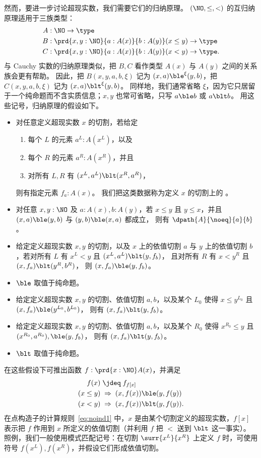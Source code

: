 然而，要进一步讨论超现实数，我们需要它们的归纳原理。
$(\NO,\le,<)$ 的互归纳原理适用于三族类型：
\begin{align*}
  A &: \NO\to\type\\
  B &: \prd{x,y:\NO}{a:A(x)}{b:A(y)} (x\le y) \to \type\\
  C &: \prd{x,y:\NO}{a:A(x)}{b:A(y)} (x<y) \to \type.
\end{align*}
与 Cauchy 实数的归纳原理类似，把 $B,C$ 看作类型 $A(x)$ 与 $A(y)$ 之间的关系族会更有帮助。
因此，把 $B(x,y,a,b,\xi)$ 记为 $(x,a) \ble^\xi (y,b)$，把 $C(x,y,a,b,\xi)$ 记为 $(x,a) \blt^\xi (y,b)$。
同样地，我们通常省略 $\xi$，因为它只居留于一个纯命题而不含实质信息；$x,y$ 也常可省略，只写 $a\ble b$ 或 $a\blt b$。
用这些记号，归纳原理的假设如下。
\begin{itemize}
\item 对任意定义超现实数 $x$ 的切割，若给定
  \begin{enumerate}
  \item 每个 $L$ 的元素 $a^L:A(x^L)$，以及
  \item 每个 $R$ 的元素 $a^R:A(x^R)$，并且
  \item 对所有 $L,R$ 有 $(x^L,a^L) \blt (x^R,a^R)$，
  \end{enumerate}
  则有指定元素 $f_a:A(x)$。
  我们把这类数据称为定义 $x$ 的切割上的
  。
\item 对任意 $x,y:\NO$ 及 $a:A(x), b:A(y)$，若 $x\le y$ 且 $y\le x$，并且 $(x,a) \ble (y,b)$
  与 $(y,b) \ble (x,a)$ 都成立，
  则有 $\dpath{A}{\noeq}{a}{b}$。
\item 给定定义超现实数 $x,y$ 的切割，以及 $x$ 上的依值切割 $a$ 与 $y$ 上的依值切割 $b$，若对所有 $L$ 有 $x^L<y$ 且 $(x^L,a^L)\blt (y,f_b)$，
  且对所有 $R$ 有 $x<y^R$ 且 $(x,f_a) \blt (y^R,b^R)$，
  则 $(x,f_a) \ble (y,f_b)$。
\item $\ble$ 取值于纯命题。
\item 给定定义超现实数 $x,y$ 的切割、依值切割 $a,b$，以及某个 $L_0$ 使得 $x\le y^{L_0}$ 且 $(x,f_a) \ble (y^{L_0},b^{L_0})$，
  则有 $(x,f_a) \blt (y,f_b)$。
\item 给定定义超现实数 $x,y$ 的切割、依值切割 $a,b$，以及某个 ${R_0}$ 使得 $x^{R_0}\le y$ 且 $(x^{R_0},a^{R_0}),\ble (y,f_b)$，
  则有 $(x,f_a) \blt (y,f_b)$。
\item $\blt$ 取值于纯命题。
\end{itemize}
在这些假设下可推出函数 $f:\prd{x:\NO} A(x)$，并满足
\begin{align}
  f(x) &\;\jdeq\; f_{f[x]} \label{eq:noind1}\\
  (x\le y) &\;\Rightarrow\; (x,f(x)) \ble (y,f(y)) \notag\\
  (x< y) &\;\Rightarrow\; (x,f(x)) \blt (y,f(y)). \notag
\end{align}
在点构造子的计算规则~\eqref{eq:noind1} 中，$x$ 是由某个切割定义的超现实数，$f[x]$ 表示把 $f$ 作用到 $x$ 所定义的依值切割（并利用 $f$ 把 $<$ 送到 $\blt$ 这一事实）。
照例，我们一般使用模式匹配记号：在切割 $\surr{x^L}{x^R}$ 上定义 $f$ 时，可使用符号 $f(x^L),f(x^R)$，并假设它们形成依值切割。


